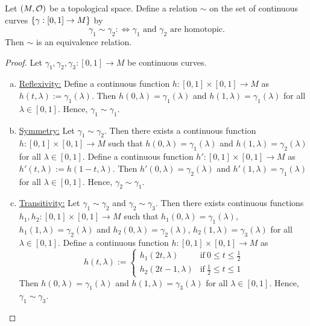 \begin{proposition}\label{prop:homotopy_equivalence_relation}
	Let \((M, \mathcal{O})\) be a topological space. Define a relation \(\sim\) on the set of continuous curves \(\qty{\gamma: [0, 1] \to M}\) by
	\begin{equation}
		\gamma_1 \sim \gamma_2 :\iff \gamma_1 \text{ and } \gamma_2 \text{ are homotopic}. \label{eq:homotopy_equivalence_relation}
	\end{equation}
	Then \(\sim\) is an equivalence relation.
\end{proposition}
\begin{proof}
	Let \(\gamma_1, \gamma_2, \gamma_3: [0, 1] \to M\) be continuous curves.
	\begin{enumerate}[(a)]
		\item \uline{Reflexivity:} Define a continuous function \(h: [0, 1] \times [0, 1] \to M\) as \(h(t, \lambda) := \gamma_1(\lambda)\). Then \(h(0, \lambda) = \gamma_1(\lambda)\) and \(h(1, \lambda) = \gamma_1(\lambda)\) for all \(\lambda \in [0, 1]\). Hence, \(\gamma_1 \sim \gamma_1\).
		\item \uline{Symmetry:} Let \(\gamma_1 \sim \gamma_2\). Then there exists a continuous function \(h: [0, 1] \times [0, 1] \to M\) such that \(h(0, \lambda) = \gamma_1(\lambda)\) and \(h(1, \lambda) = \gamma_2(\lambda)\) for all \(\lambda \in [0, 1]\). Define a continuous function \(h': [0, 1] \times [0, 1] \to M\) as \(h'(t, \lambda) := h(1 - t, \lambda)\). Then \(h'(0, \lambda) = \gamma_2(\lambda)\) and \(h'(1, \lambda) = \gamma_1(\lambda)\) for all \(\lambda \in [0, 1]\). Hence, \(\gamma_2 \sim \gamma_1\).
		\item \uline{Transitivity:} Let \(\gamma_1 \sim \gamma_2\) and \(\gamma_2 \sim \gamma_3\). Then there exists continuous functions \(h_1, h_2: [0, 1] \times [0, 1] \to M\) such that \(h_1(0, \lambda) = \gamma_1(\lambda)\), \(h_1(1, \lambda) = \gamma_2(\lambda)\) and \(h_2(0, \lambda) = \gamma_2(\lambda)\), \(h_2(1, \lambda) = \gamma_3(\lambda)\) for all \(\lambda \in [0, 1]\). Define a continuous function \(h: [0, 1] \times [0, 1] \to M\) as
		      \begin{equation}
			      h(t, \lambda) := \begin{cases}
				      h_1(2t, \lambda)     & \text{if}\ 0 \le t \le \frac{1}{2} \\
				      h_2(2t - 1, \lambda) & \text{if}\ \frac{1}{2} \le t \le 1
			      \end{cases}
		      \end{equation}
		      Then \(h(0, \lambda) = \gamma_1(\lambda)\) and \(h(1, \lambda) = \gamma_3(\lambda)\) for all \(\lambda \in [0, 1]\). Hence, \(\gamma_1 \sim \gamma_3\).
	\end{enumerate}
\end{proof}

